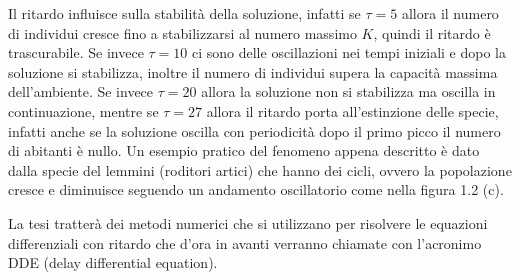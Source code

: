 \begin{exm}
\begin{figure}[!ht]
\end{figure}
Il ritardo influisce sulla stabilità della soluzione, infatti se $\tau=5$ allora 
il numero di individui cresce fino a stabilizzarsi al numero massimo $K$, quindi il ritardo 
è trascurabile. Se invece $\tau=10$ ci sono delle oscillazioni nei tempi iniziali e dopo la soluzione 
si stabilizza, inoltre il numero di individui supera la capacità massima dell'ambiente.
Se invece $\tau=20$ allora la soluzione non si stabilizza ma oscilla in continuazione, mentre se 
$\tau=27$ allora il ritardo porta all'estinzione delle specie, infatti anche se la soluzione oscilla 
con periodicità dopo il primo picco il numero di abitanti è nullo.
Un esempio pratico del fenomeno appena descritto è dato dalla specie del lemmini (roditori artici) 
che hanno dei cicli, ovvero la popolazione cresce e diminuisce seguendo un andamento oscillatorio 
come nella figura 1.2 (c).
\end{exm}

La tesi tratterà dei metodi numerici che si utilizzano per risolvere le equazioni differenziali 
con ritardo che d'ora in avanti verranno chiamate con l'acronimo DDE (delay differential equation).

